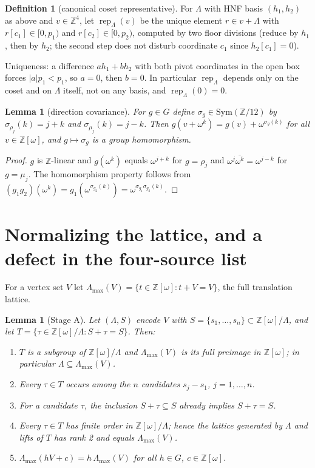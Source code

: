 \documentclass[11pt]{article}
\newtheorem{lemma}[theorem]{Lemma}
\theoremstyle{definition}
\newtheorem{definition}[theorem]{Definition}
\newcommand{\Zw}{\mathbb{Z}[\omega]}
\newcommand{\Z}{\mathbb{Z}}
\newcommand{\Lam}{\Lambda}
\newcommand{\Lmax}{\Lambda_{\max}}
\newcommand{\rep}{\operatorname{rep}}
\begin{document}
\begin{definition}[canonical coset representative]\label{def:rep}
For $\Lam$ with HNF basis $(h_1,h_2)$ as above and $v\in\Z^4$, let $\rep_\Lam(v)$ be the
unique element $r\in v+\Lam$ with $r[c_1]\in[0,p_1)$ and $r[c_2]\in[0,p_2)$, computed by two
floor divisions (reduce by $h_1$, then by $h_2$; the second step does not disturb
coordinate $c_1$ since $h_2[c_1]=0$).
\end{definition}

Uniqueness: a difference $ah_1+bh_2$ with both pivot coordinates in the open box forces
$|a|p_1<p_1$, so $a=0$, then $b=0$. In particular $\rep_\Lam$ depends only on the coset and
on $\Lam$ itself, not on any basis, and $\rep_\Lam(0)=0$.

\begin{lemma}[direction covariance]\label{lem:sigma}
For $g\in G$ define $\sigma_g\in\mathrm{Sym}(\Z/12)$ by $\sigma_{\rho_j}(k)=j+k$ and
$\sigma_{\mu_j}(k)=j-k$. Then $g(v+\omega^k)=g(v)+\omega^{\sigma_g(k)}$ for all
$v\in\Zw$, and $g\mapsto\sigma_g$ is a group homomorphism.
\end{lemma}

\begin{proof}
$g$ is $\Z$-linear and $g(\omega^k)$ equals $\omega^{j+k}$ for $g=\rho_j$ and
$\omega^{j}\overline{\omega^{k}}=\omega^{j-k}$ for $g=\mu_j$. The homomorphism property
follows from $(g_1g_2)(\omega^k)=g_1(\omega^{\sigma_{g_2}(k)})
=\omega^{\sigma_{g_1}\sigma_{g_2}(k)}$.
\end{proof}

\section{Normalizing the lattice, and a defect in the four-source list}\label{sec:stagea}

For a vertex set $V$ let $\Lmax(V)=\{t\in\Zw: t+V=V\}$, the full translation lattice.

\begin{lemma}[Stage A]\label{lem:stagea}
Let $(\Lam,S)$ encode $V$ with $S=\{s_1,\dots,s_n\}\subset\Zw/\Lam$, and let
$T=\{\tau\in\Zw/\Lam : S+\tau=S\}$. Then:
\begin{enumerate}\itemsep2pt
\item[(a)] $T$ is a subgroup of $\Zw/\Lam$ and $\Lmax(V)$ is its full preimage in $\Zw$;
  in particular $\Lam\subseteq\Lmax(V)$.
\item[(b)] Every $\tau\in T$ occurs among the $n$ candidates $s_j-s_1$, $j=1,\dots,n$.
\item[(c)] For a candidate $\tau$, the inclusion $S+\tau\subseteq S$ already implies
  $S+\tau=S$.
\item[(d)] Every $\tau\in T$ has finite order in $\Zw/\Lam$; hence the lattice generated by
  $\Lam$ and lifts of $T$ has rank 2 and equals $\Lmax(V)$.
\item[(e)] $\Lmax(hV+c)=h\,\Lmax(V)$ for all $h\in G$, $c\in\Zw$.
\end{enumerate}
\end{lemma}
\end{document}
